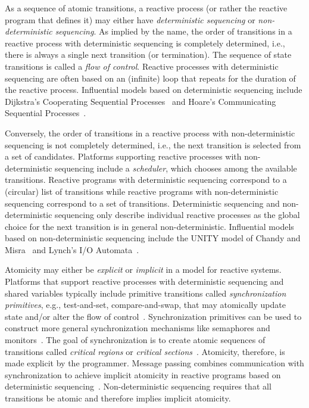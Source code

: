 As a sequence of atomic transitions, a reactive process (or rather the reactive program that defines it) may either have \emph{deterministic sequencing} or \emph{non-deterministic sequencing}.
As implied by the name, the order of transitions in a reactive process with deterministic sequencing is completely determined, i.e., there is always a single next transition (or termination).
The sequence of state transitions is called a \emph{flow of control}.
Reactive processes with deterministic sequencing are often based on an (infinite) loop that repeats for the duration of the reactive process.
Influential models based on deterministic sequencing include Dijkstra's Cooperating Sequential Processes~\cite{dijkstra1965cooperating} and Hoare's Communicating Sequential Processes~\cite{hoare1978communicating}.

Conversely, the order of transitions in a reactive process with non-deterministic sequencing is not completely determined, i.e., the next transition is selected from a set of candidates.
Platforms supporting reactive processes with non-deterministic sequencing include a \emph{scheduler}, which chooses among the available transitions.
Reactive programs with deterministic sequencing correspond to a (circular) list of transitions while reactive programs with non-deterministic sequencing correspond to a set of transitions.
Deterministic sequencing and non-deterministic sequencing only describe individual reactive processes as the global choice for the next transition is in general non-deterministic.
Influential models based on non-deterministic sequencing include the UNITY model of Chandy and Misra~\cite{chandy1989parallel} and Lynch's I/O Automata~\cite{nancy1996distributed}.

Atomicity may either be \emph{explicit} or \emph{implicit} in a model for reactive systems.
Platforms that support reactive processes with deterministic sequencing and shared variables typically include primitive transitions called \emph{synchronization primitives}, e.g., test-and-set, compare-and-swap, that may atomically update state and/or alter the flow of control~\cite{andrews1983concepts}.
Synchronization primitives can be used to construct more general synchronization mechanisms like semaphores and monitors~\cite{dijkstra1965cooperating}.
The goal of synchronization is to create atomic sequences of transitions called \emph{critical regions} or \emph{critical sections}~\cite{andrews1983concepts}.
Atomicity, therefore, is made explicit by the programmer.
Message passing combines communication with synchronization to achieve implicit atomicity in reactive programs based on deterministic sequencing~\cite{andrews1983concepts}.
Non-deterministic sequencing requires that all transitions be atomic and therefore implies implicit atomicity.

